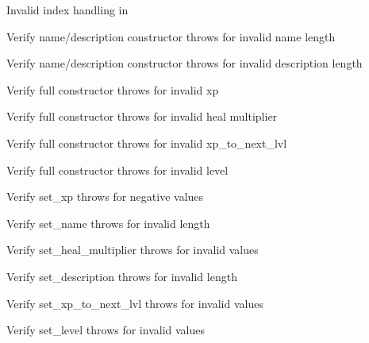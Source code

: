 \begin{DoxyRefList}
\label{test__test000027}%
%
Invalid index handling in   



\label{test__test000035}%
%
Verify name/description constructor throws for invalid name length  



\label{test__test000036}%
%
Verify name/description constructor throws for invalid description length  



\label{test__test000038}%
%
Verify full constructor throws for invalid xp  



\label{test__test000039}%
%
Verify full constructor throws for invalid heal multiplier  



\label{test__test000040}%
%
Verify full constructor throws for invalid xp\+\_\+to\+\_\+next\+\_\+lvl  



\label{test__test000041}%
%
Verify full constructor throws for invalid level  



\label{test__test000043}%
%
Verify set\+\_\+xp throws for negative values  



\label{test__test000045}%
%
Verify set\+\_\+name throws for invalid length  



\label{test__test000047}%
%
Verify set\+\_\+heal\+\_\+multiplier throws for invalid values  



\label{test__test000049}%
%
Verify set\+\_\+description throws for invalid length  



\label{test__test000051}%
%
Verify set\+\_\+xp\+\_\+to\+\_\+next\+\_\+lvl throws for invalid values  



\label{test__test000053}%
%
Verify set\+\_\+level throws for invalid values  




\end{DoxyRefList}
